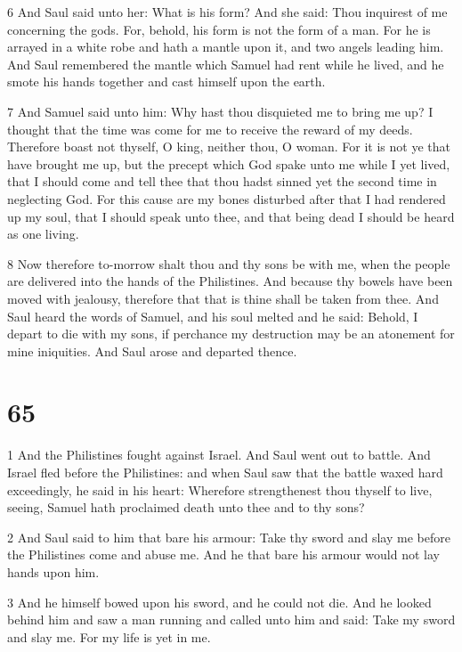 \par 6 And Saul said unto her: What is his form? And she said: Thou inquirest of me concerning the gods. For, behold, his form is not the form of a man. For he is arrayed in a white robe and hath a mantle upon it, and two angels leading him. And Saul remembered the mantle which Samuel had rent while he lived, and he smote his hands together and cast himself upon the earth.

\par 7 And Samuel said unto him: Why hast thou disquieted me to bring me up? I thought that the time was come for me to receive the reward of my deeds. Therefore boast not thyself, O king, neither thou, O woman. For it is not ye that have brought me up, but the precept which God spake unto me while I yet lived, that I should come and tell thee that thou hadst sinned yet the second time in neglecting God. For this cause are my bones disturbed after that I had rendered up my soul, that I should speak unto thee, and that being dead I should be heard as one living. 

\par 8 Now therefore to-morrow shalt thou and thy sons be with me, when the people are delivered into the hands of the Philistines. And because thy bowels have been moved with jealousy, therefore that that is thine shall be taken from thee. And Saul heard the words of Samuel, and his soul melted and he said: Behold, I depart to die with my sons, if perchance my destruction may be an atonement for mine iniquities. And Saul arose and departed thence.

\chapter{65}

\par 1 And the Philistines fought against Israel. And Saul went out to battle. And Israel fled before the Philistines: and when Saul saw that the battle waxed hard exceedingly, he said in his heart: Wherefore strengthenest thou thyself to live, seeing, Samuel hath proclaimed death unto thee and to thy sons? 

\par 2 And Saul said to him that bare his armour: Take thy sword and slay me before the Philistines come and abuse me. And he that bare his armour would not lay hands upon him. 

\par 3 And he himself bowed upon his sword, and he could not die. And he looked behind him and saw a man running and called unto him and said: Take my sword and slay me. For my life is yet in me. 

